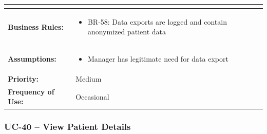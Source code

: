 \documentclass[12pt,a4paper]{article}
\begin{document}
\begin{longtable}{|p{4.5cm}|p{10.5cm}|}
\begin{itemize}
\end{itemize} \\
\hline
\textbf{Business Rules:} &
\begin{itemize}
  \item BR-58: Data exports are logged and contain anonymized patient data
\end{itemize} \\
\hline
\textbf{Assumptions:} &
\begin{itemize}
  \item Manager has legitimate need for data export
\end{itemize} \\
\hline
\textbf{Priority:} & Medium \\
\hline
\textbf{Frequency of Use:} & Occasional \\
\hline
\end{longtable}

\subsubsection{UC-40 – View Patient Details}
\end{document}
